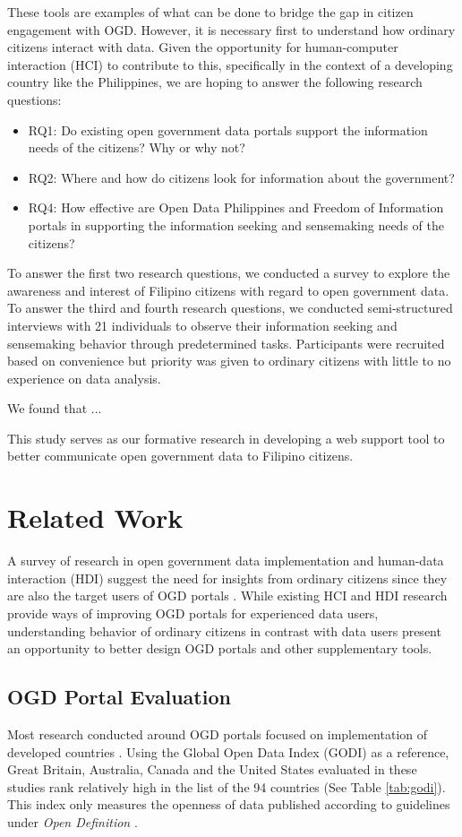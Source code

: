 \documentclass{sigchi}
\begin{document}
These tools are examples of what can be done to bridge the gap in citizen engagement with OGD. However, it is necessary first to understand how ordinary citizens interact with data. Given the opportunity for human-computer interaction (HCI) to contribute to this, specifically in the context of a developing country like the Philippines, we are hoping to answer the following research questions:
\begin{itemize}
    \item RQ1: Do existing open government data portals support the information needs of the citizens? Why or why not?
    \item RQ2: Where and how do citizens look for information about the government?
    \item RQ4: How effective are Open Data Philippines and Freedom of Information portals in supporting the information seeking and sensemaking needs of the citizens?
\end{itemize}

To answer the first two research questions, we conducted a survey to explore the awareness and interest of Filipino citizens with regard to open government data. To answer the third and fourth research questions, we conducted semi-structured interviews with 21 individuals to observe their information seeking and sensemaking behavior through predetermined tasks. Participants were recruited based on convenience but priority was given to ordinary citizens with little to no experience on data analysis.

We found that ...

This study serves as our formative research in developing a web support tool to better communicate open government data to Filipino citizens.


\section{Related Work}
A survey of research in open government data implementation and human-data interaction (HDI) suggest the need for insights from ordinary citizens since they are also the target users of OGD portals \cite{warwick2017}. While existing HCI and HDI research provide ways of improving OGD portals for experienced data users, understanding behavior of ordinary citizens in contrast with data users present an opportunity to better design OGD portals and other supplementary tools. 

\subsection{OGD Portal Evaluation}
Most research conducted around OGD portals focused on implementation of developed countries \cite{kacprzak2019characterising, klimek2019dcat, koesten2019collaborative,Parycek2014}. Using the Global Open Data Index (GODI) as a reference, Great Britain, Australia, Canada and the United States evaluated in these studies rank relatively high in the list of the 94 countries (See Table \ref{tab:godi})\cite{godimetric2016}. This index only measures the openness of data published according to guidelines under \textit{Open Definition} \cite{godimetric2016}. 
\end{document}
